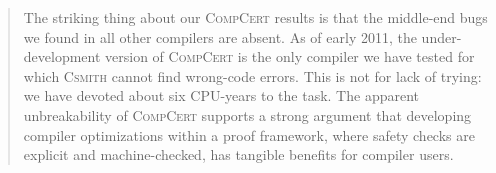 {\blockquote{ The striking thing about our \textsc{CompCert} results is that the
  middle-end bugs we found in all other compilers are absent. As of early 2011,
  the under-development version of \textsc{CompCert} is the only compiler we
  have tested for which \textsc{Csmith} cannot find wrong-code errors. This is
  not for lack of trying: we have devoted about six CPU-years to the task. The
  apparent unbreakability of \textsc{CompCert} supports a strong argument that
  developing compiler optimizations within a proof framework, where safety
  checks are explicit and machine-checked, has tangible benefits for compiler
  users.}


}

